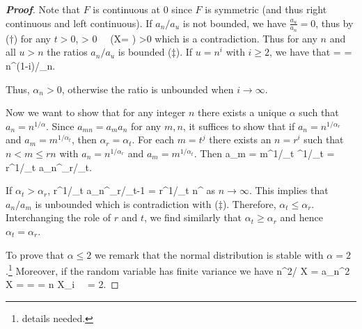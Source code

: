 \begin{proof}[\bf Proof]
Note that $F$ is continuous at 0 since $F$ is symmetric (and thus right continuous and left continuous). If $a_n/a_u$ is not bounded, we have $\frac{a_u }{a_n} = 0$, thus by ($\dag$) for any $t>0$, 
\be
\pro{} \geq {} \pro{} > 0 \ \ra\ \pro(X= \infty) >0
\ee
which is a contradiction. Thus for any $n$ and all $u>n$ the ratios $a_n/a_u$ is bounded ($\ddag$). If $u=n^i$ with $i\geq 2$, we have that 
\be
{} =  = n^{(1-i)/\alpha_n}.
\ee

Thus, $\alpha_n >0$, otherwise the ratio is unbounded when $i \to \infty$. 
%
%

%
%

Now we want to show that for any integer $n$ there exists a unique $\alpha$ such that $a_n = n^{1/\alpha}$. Since $a_{mn} = a_ma_n$ for any $m,n$, it suffices to show that if $a_n = n^{1/\alpha_r}$ and $a_m = m^{1/\alpha_t}$, then $\alpha_r = \alpha_t$. For each $m = t^j$ there exists an $n = r^i$ such that $n< m\leq rn$ with $a_n = n^{1/\alpha_r}$ and $a_m = m^{1/\alpha_t}$. Then
\be
a_m = m^{1/\alpha_t} \leq {}^{1/\alpha_t} = r^{1/\alpha_t} a_n^{\alpha_r/\alpha_t}.
\ee

If $\alpha_t > \alpha_r$,
\be
{} \leq r^{1/\alpha_t} a_n^{\alpha_r/\alpha_t-1} = r^{1/\alpha_t} n^{}  
\ee
as $n\to\infty$. This implies that $a_n/a_m$ is unbounded which is contradiction with ($\ddag$). Therefore, $\alpha_t \leq \alpha_r$. Interchanging the role of $r$ and $t$, we find similarly that $\alpha_t \geq \alpha_r$ and hence $\alpha_t = \alpha_r$. 


To prove that $\alpha \leq 2$ we remark that the normal distribution is stable with $\alpha =2$.\footnote{details needed.} Moreover, if the random variable has finite variance we have %
\be
n^{2/\alpha} \var X = a_n^2 \var X = \var{} = \var{} = n \var X_i \ \ra\ \alpha = 2.
\ee


\end{proof}
